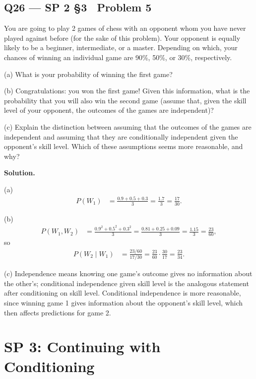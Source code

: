 \documentclass[11pt]{article}
\begin{document}
\subsection*{Q26 --- SP 2 \S3 \textperiodcentered\ Problem 5}
\begin{qbox}
You are going to play 2 games of chess with an opponent whom you have never played against before (for the sake of this problem). Your opponent is equally likely to be a beginner, intermediate, or a master. Depending on which, your chances of winning an individual game are 90\%, 50\%, or 30\%, respectively.

(a) What is your probability of winning the first game?

(b) Congratulations: you won the first game! Given this information, what is the probability that you will also win the second game (assume that, given the skill level of your opponent, the outcomes of the games are independent)?

(c) Explain the distinction between assuming that the outcomes of the games are independent and assuming that they are conditionally independent given the opponent's skill level. Which of these assumptions seems more reasonable, and why?
\end{qbox}
\textbf{Solution.}

(a)
\begin{align*}
P(W_1) &= \frac{0.9+0.5+0.3}{3} = \frac{1.7}{3} = \frac{17}{30}.
\end{align*}

(b)
\begin{align*}
P(W_1,W_2) &= \frac{0.9^2+0.5^2+0.3^2}{3} = \frac{0.81+0.25+0.09}{3} = \frac{1.15}{3} = \frac{23}{60},
\end{align*}
so
\begin{align*}
P(W_2\mid W_1) &= \frac{23/60}{17/30} = \frac{23}{60}\cdot\frac{30}{17} = \frac{23}{34}.
\end{align*}

(c) Independence means knowing one game's outcome gives no information about the other's; conditional independence given skill level is the analogous statement after conditioning on skill level. Conditional independence is more reasonable, since winning game 1 gives information about the opponent's skill level, which then affects predictions for game 2.

\section{SP 3: Continuing with Conditioning}
\end{document}

